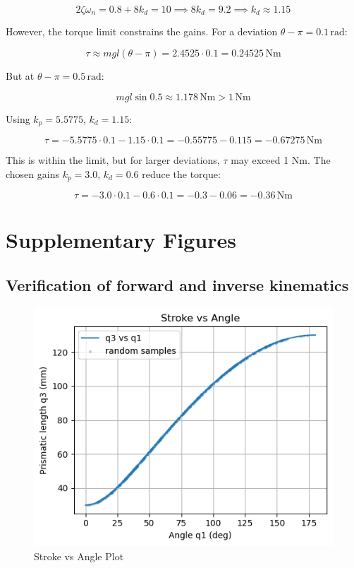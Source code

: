 \documentclass[12pt,a4paper]{article}
\begin{document}
\begin{equation}
2 \zeta \omega_n = 0.8 + 8 k_d = 10 \implies 8 k_d = 9.2 \implies k_d \approx 1.15
\end{equation}

However, the torque limit constrains the gains. For a deviation \( \theta - \pi = 0.1 \, \text{rad} \):

\begin{equation}
\tau \approx m g l (\theta - \pi) = 2.4525 \cdot 0.1 = 0.24525 \, \text{Nm}
\end{equation}

But at \( \theta - \pi = 0.5 \, \text{rad} \):

\begin{equation}
m g l \sin 0.5 \approx 1.178 \, \text{Nm} > 1 \, \text{Nm}
\end{equation}

Using \( k_p = 5.5775 \), \( k_d = 1.15 \):

\begin{equation}
\tau = -5.5775 \cdot 0.1 - 1.15 \cdot 0.1 = -0.55775 - 0.115 = -0.67275 \, \text{Nm}
\end{equation}

This is within the limit, but for larger deviations, \(\tau\) may exceed 1 Nm. The chosen gains \( k_p = 3.0 \), \( k_d = 0.6 \) reduce the torque:

\begin{equation}
\tau = -3.0 \cdot 0.1 - 0.6 \cdot 0.1 = -0.3 - 0.06 = -0.36 \, \text{Nm}
\end{equation}

\section{Supplementary Figures}
\label{app:suppl-figs}

\subsection{Verification of forward and inverse kinematics}

\begin{figure}[htbp]
  \centering
  \includegraphics[width=0.9\linewidth]{../figs/exercise_5_1.png}
  \caption{Stroke vs Angle Plot}
  \label{fig:stroke_vs_angle}
\end{figure}
\end{document}
